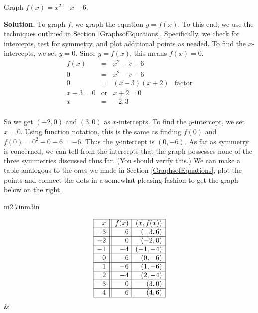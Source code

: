 \begin{ex}  Graph $f(x) = x^2 - x - 6$.

\medskip

{\bf Solution.}  To graph $f$, we graph the equation $y = f(x)$.  To this end, we use the techniques outlined in Section \ref{GraphsofEquations}.  Specifically, we check for intercepts, test for symmetry, and plot additional points as needed.  To find the $x$-intercepts, we set $y=0$. Since $y = f(x)$, this means $f(x) = 0$. \[ \begin{array}{rclr}   

f(x) & = & x^2 - x - 6 & \\ 
0 & = & x^2 - x - 6 & \\ 
0 & = & (x-3)(x+2) & \mbox{factor} \\ 
x-3 = 0 & \mbox{or} & x+2 = 0 & \\
x & = & -2, 3 & \\

\end{array} \]

So we get $(-2,0)$ and $(3,0)$ as $x$-intercepts.  To find the $y$-intercept, we set $x=0$.  Using function notation, this is the same as finding $f(0)$ and  $f(0) = 0^2 - 0 - 6 = -6.$  Thus the $y$-intercept is $(0,-6)$.  As far as symmetry is concerned, we can tell from the intercepts that the graph possesses none of the three symmetries discussed thus far. (You should verify this.)  We can make a table analogous to the ones we made in Section \ref{GraphsofEquations}, plot the points and connect the dots in a somewhat pleasing fashion to get the graph below on the right.

\hspace{.5in} \begin{tabular}{m{2.7in}m{3in}}

\[ \begin{array}{|r||r|r|}  

\hline

 x & f(x) & (x,f(x)) \\ \hline
-3  & 6 & (-3, 6) \\  \hline
-2  & 0 & (-2,0) \\  \hline
-1 & -4 & ( -1, -4) \\  \hline
0  & -6 & ( 0 ,-6) \\  \hline
1 & -6 & ( 1, -6) \\  \hline
2  & -4 & (2,-4) \\  \hline
3  & 0 & (3, 0) \\  \hline
4  & 6 & (4, 6) \\  \hline
\end{array} \] &


\end{tabular}
\end{ex}

